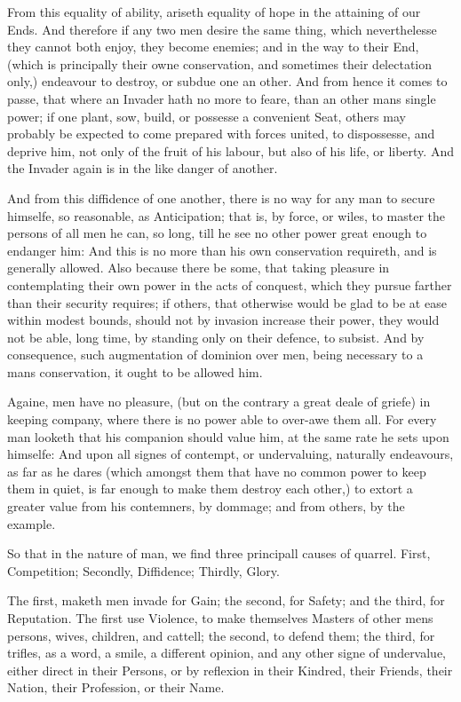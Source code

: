 From this equality of ability, ariseth equality of hope in the
attaining of our Ends. And therefore if any two men desire the same
thing, which neverthelesse they cannot both enjoy, they become
enemies; and in the way to their End, (which is principally their owne
conservation, and sometimes their delectation only,) endeavour to
destroy, or subdue one an other. And from hence it comes to passe,
that where an Invader hath no more to feare, than an other mans single
power; if one plant, sow, build, or possesse a convenient Seat, others
may probably be expected to come prepared with forces united, to
dispossesse, and deprive him, not only of the fruit of his labour, but
also of his life, or liberty. And the Invader again is in the like
danger of another.

And from this diffidence of one another, there is no way for any man
to secure himselfe, so reasonable, as Anticipation; that is, by force,
or wiles, to master the persons of all men he can, so long, till he
see  no other power great enough to endanger him: And this is
no more than his own conservation requireth, and is generally allowed.
Also because there be some, that taking pleasure in contemplating
their own power in the acts of conquest, which they pursue farther
than their security requires; if others, that otherwise would be glad
to be at ease within modest bounds, should not by invasion increase
their power, they would not be able, long time, by standing only on
their defence, to subsist. And by consequence, such augmentation of
dominion over men, being necessary to a mans conservation, it ought to
be allowed him.

Againe, men have no pleasure, (but on the contrary a great deale of
griefe) in keeping company, where there is no power able to over-awe
them all. For every man looketh that his companion should value him,
at the same rate he sets upon himselfe: And upon all signes of
contempt, or undervaluing, naturally endeavours, as far as he dares
(which amongst them that have no common power to keep them in quiet,
is far enough to make them destroy each other,) to extort a greater
value from his contemners, by dommage; and from others, by the
example.

So that in the nature of man, we find three principall causes of
quarrel. First, Competition; Secondly, Diffidence; Thirdly, Glory.

The first, maketh men invade for Gain; the second, for Safety; and the
third, for Reputation. The first use Violence, to make themselves
Masters of other mens persons, wives, children, and cattell; the
second, to defend them; the third, for trifles, as a word, a smile, a
different opinion, and any other signe of undervalue, either direct in
their Persons, or by reflexion in their Kindred, their Friends, their
Nation, their Profession, or their Name.

